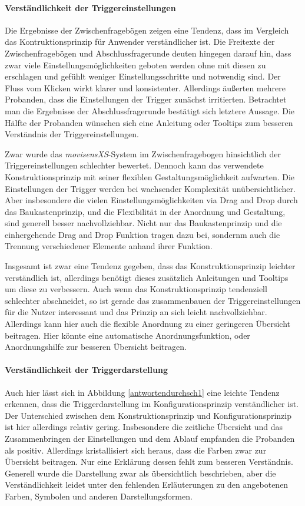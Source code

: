 \paragraph{Verständlichkeit der Triggereinstellungen}
Die Ergebnisse der Zwischenfragebögen zeigen eine Tendenz, dass im Vergleich das Kontruktionsprinzip für Anwender verständlicher ist. Die Freitexte der Zwischenfragebögen und Abschlussfragerunde deuten hingegen darauf hin, dass zwar viele Einstellungsmöglichkeiten geboten werden ohne mit diesen zu erschlagen und gefühlt weniger Einstellungsschritte und notwendig sind. Der Fluss vom Klicken wirkt klarer und konsistenter. Allerdings äußerten mehrere Probanden, dass die Einstellungen der Trigger zunächst irritierten. Betrachtet man die Ergebnisse der Abschlussfragerunde bestätigt sich letztere Aussage. Die Hälfte der Probanden wünschen sich eine Anleitung oder Tooltips zum besseren Verständnis der Triggereinstellungen.

Zwar wurde das \emph{movisensXS}-System im Zwischenfragebogen hinsichtlich der Triggereinstellungen schlechter bewertet. Dennoch kann das verwendete Konstruktionsprinzip mit seiner flexiblen Gestaltungsmöglichkeit aufwarten. Die Einstellungen der Trigger werden bei wachsender Komplexität unübersichtlicher. Aber insbesondere die vielen Einstellungsmöglichkeiten via Drag and Drop durch das Baukastenprinzip, und die Flexibilität in der Anordnung und Gestaltung, sind generell besser nachvollziehbar. Nicht nur das Baukastenprinzip und die einhergehende Drag and Drop Funktion tragen dazu bei, sondernm auch die Trennung verschiedener Elemente anhand ihrer Funktion. 

Insgesamt ist zwar eine Tendenz gegeben, dass das Konstruktionsprinzip leichter verständlich ist, allerdings benötigt dieses zusätzlich Anleitungen und Tooltips um diese zu verbessern. Auch wenn das Konstruktionsprinzip tendenziell schlechter abschneidet, so ist gerade das zusammenbauen der Triggereinstellungen für die Nutzer interessant und das Prinzip an sich leicht nachvollziehbar. Allerdings kann hier auch die flexible Anordnung zu einer geringeren Übersicht beitragen. Hier könnte eine automatische Anordnungsfunktion, oder Anordnungshilfe zur besseren Übersicht beitragen.


\paragraph{Verständlichkeit der Triggerdarstellung}
Auch hier lässt sich in Abbildung \ref{antwortendurchsch1} eine leichte Tendenz erkennen, dass die Triggerdarstellung im Konfigurationsprinzip verständlicher ist. Der Unterschied zwischen dem Konstruktionsprinzip und Konfigurationsprinzip ist hier allerdings relativ gering. Insbesondere die zeitliche Übersicht und das Zusammenbringen der Einstellungen und dem Ablauf empfanden die Probanden als positiv. Allerdings kristallisiert sich heraus, dass die Farben zwar zur Übersicht beitragen. Nur eine Erklärung dessen fehlt zum besseren Verständnis. Generell wurde die Darstellung zwar als übersichtlich beschrieben, aber die Verständlichkeit leidet unter den fehlenden Erläuterungen zu den angebotenen Farben, Symbolen und anderen Darstellungsformen. 

